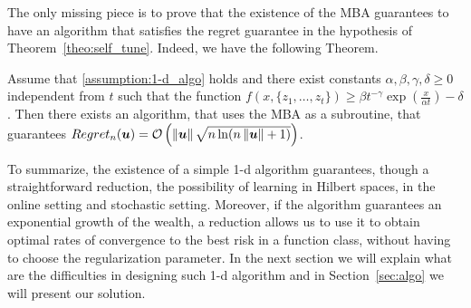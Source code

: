 The only missing piece is to prove that the existence of the \ac{MBA} guarantees to have an algorithm that satisfies the regret guarantee in the hypothesis of Theorem~\ref{theo:self_tune}. Indeed, we have the following Theorem.
\begin{theorem}
\label{theo:regret_pistol}
Assume that \ref{assumption:1-d_algo} holds and there exist constants $\alpha,\beta,\gamma,\delta\geq0$ independent from $t$ such that the function $f(x,\{z_1, \ldots, z_t\}) \geq \beta t^{-\gamma} \exp(\frac{x}{\alpha t})-\delta$.
Then there exists an algorithm, that uses the \ac{MBA} as a subroutine, that guarantees $Regret_n(\boldsymbol{u})=\mathcal{O}\left(\left\|{\boldsymbol{u}}\right\|\sqrt{n \ln(n \left\|{\boldsymbol{u}}\right\|+1)}\right)$.
\end{theorem}



To summarize, the existence of a simple 1-d algorithm guarantees, though a straightforward reduction, the possibility of learning in Hilbert spaces, in the online setting and stochastic setting. Moreover, if the algorithm guarantees an exponential growth of the wealth, a reduction allows us to use it to obtain optimal rates of convergence to the best risk in a function class, without having to choose the regularization parameter.
In the next section we will explain what are the difficulties in designing such 1-d algorithm and in Section~\ref{sec:algo} we will present our solution.